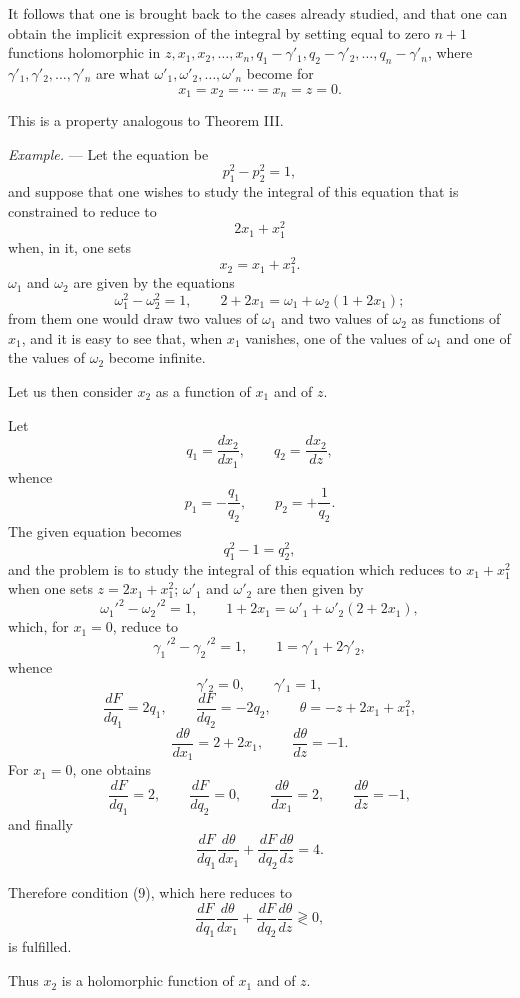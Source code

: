 \documentclass[11pt]{article}
\begin{document}
It follows that one is brought back to the cases already studied, and that one can obtain the implicit expression of the integral by setting equal to zero $n+1$ functions holomorphic in $z,x_1,x_2,\ldots,x_n,q_1-\gamma'_1,q_2-\gamma'_2,\ldots,q_n-\gamma'_n$, where $\gamma'_1,\gamma'_2,\ldots,\gamma'_n$ are what $\omega'_1,\omega'_2,\ldots,\omega'_n$ become for
\[
x_1=x_2=\cdots=x_n=z=0.
\]

This is a property analogous to Theorem III.

\emph{Example.} — Let the equation be
\[
p_1^2-p_2^2=1,
\]
and suppose that one wishes to study the integral of this equation that is constrained to reduce to
\[
2x_1+x_1^2
\]
when, in it, one sets
\[
x_2=x_1+x_1^2.
\]
$\omega_1$ and $\omega_2$ are given by the equations
\[
\omega_1^2-\omega_2^2=1,\qquad
2+2x_1=\omega_1+\omega_2(1+2x_1);
\]
from them one would draw two values of $\omega_1$ and two values of $\omega_2$ as functions of $x_1$, and it is easy to see that, when $x_1$ vanishes, one of the values of $\omega_1$ and one of the values of $\omega_2$ become infinite.

Let us then consider $x_2$ as a function of $x_1$ and of $z$.

Let
\[
q_1=\frac{dx_2}{dx_1},\qquad q_2=\frac{dx_2}{dz},
\]
whence
\[
p_1=-\frac{q_1}{q_2},\qquad p_2=+\frac{1}{q_2}.
\]
The given equation becomes
\[
q_1^2-1=q_2^2,
\]
and the problem is to study the integral of this equation which reduces to $x_1+x_1^2$ when one sets $z=2x_1+x_1^2$; $\omega'_1$ and $\omega'_2$ are then given by
\[
\omega_1'^2-\omega_2'^2=1,\qquad
1+2x_1=\omega'_1+\omega'_2(2+2x_1),
\]
which, for $x_1=0$, reduce to
\[
\gamma_1'^2-\gamma_2'^2=1,\qquad 1=\gamma'_1+2\gamma'_2,
\]
whence
\[
\gamma'_2=0,\qquad \gamma'_1=1,
\]
\[
\frac{dF}{dq_1}=2q_1,\qquad
\frac{dF}{dq_2}=-2q_2,\qquad
\theta=-z+2x_1+x_1^2,
\]
\[
\frac{d\theta}{dx_1}=2+2x_1,\qquad
\frac{d\theta}{dz}=-1.
\]
For $x_1=0$, one obtains
\[
\frac{dF}{dq_1}=2,\qquad
\frac{dF}{dq_2}=0,\qquad
\frac{d\theta}{dx_1}=2,\qquad
\frac{d\theta}{dz}=-1,
\]
and finally
\[
\frac{dF}{dq_1}\frac{d\theta}{dx_1}
+
\frac{dF}{dq_2}\frac{d\theta}{dz}=4.
\]

Therefore condition (9), which here reduces to
\[
\frac{dF}{dq_1}\frac{d\theta}{dx_1}
+
\frac{dF}{dq_2}\frac{d\theta}{dz}\gtrless0,
\]
is fulfilled.

Thus $x_2$ is a holomorphic function of $x_1$ and of $z$.
\end{document}
